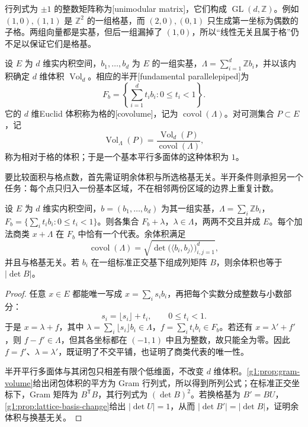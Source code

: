 行列式为 \(\pm1\) 的整数矩阵称为[unimodular matrix]，它们构成 \(\operatorname{GL}(d,\mathbb Z)\)。例如 \((1,0),(1,1)\) 是 \(\mathbb Z^2\) 的一组格基，而 \((2,0),(0,1)\) 只生成第一坐标为偶数的子格。两组向量都是实基，但后一组漏掉了 \((1,0)\)，所以“线性无关且属于格”仍不足以保证它们是格基。

\begin{definition}
	\label{g1:def:lattice-covolume}
	设 \(E\) 为 \(d\) 维实内积空间，\(b_1,\ldots,b_d\) 为 \(E\) 的一组实基，\(\Lambda=\sum_{i=1}^d\mathbb Z b_i\)，并以该内积确定 \(d\) 维体积 \(\operatorname{Vol}_d\)。相应的半开[fundamental parallelepiped]为
	\[
		F_b=\left\{\sum_{i=1}^d t_i b_i:0\le t_i<1\right\}.
	\]
	它的 \(d\) 维Euclid 体积称为格的[covolume]，记为 \(\operatorname{covol}(\Lambda)\)。对可测集合 \(P\subset E\)，记
	\[
		\operatorname{Vol}_{\Lambda}(P)
		=\frac{\operatorname{Vol}_d(P)}{\operatorname{covol}(\Lambda)},
	\]
	称为相对于格的体积；于是一个基本平行多面体的这种体积为 \(1\)。
\end{definition}

要比较面积与格点数，首先需证明余体积与所选格基无关。半开条件则承担另一个任务：每个点只归入一份基本区域，不在相邻两份区域的边界上重复计数。

\begin{proposition}
	\label{g1:prop:lattice-fundamental-domain}
	设 \(E\) 为 \(d\) 维实内积空间，\(b=(b_1,\ldots,b_d)\) 为其一组实基，\(\Lambda=\sum_i\mathbb Z b_i\)，\(F_b=\{\sum_i t_i b_i:0\le t_i<1\}\)。则各集合 \(F_b+\lambda\)，\(\lambda\in\Lambda\)，两两不交且并成 \(E\)。每个加法商类 \(x+\Lambda\) 在 \(F_b\) 中恰有一个代表。余体积满足
	\[
		\operatorname{covol}(\Lambda)
		=\sqrt{\det\bigl(\langle b_i,b_j\rangle\bigr)_{i,j=1}^d},
	\]
	并且与格基无关。若 \(b_i\) 在一组标准正交基下组成列矩阵 \(B\)，则余体积也等于 \(|\det B|\)。
\end{proposition}
\begin{proof}
	任意 \(x\in E\) 都能唯一写成 \(x=\sum_i s_i b_i\)，再把每个实数分成整数与小数部分：
	\[
		s_i=\lfloor s_i\rfloor+t_i,\qquad 0\le t_i<1.
	\]
	于是 \(x=\lambda+f\)，其中 \(\lambda=\sum_i\lfloor s_i\rfloor b_i\in\Lambda\)，\(f=\sum_i t_i b_i\in F_b\)。若还有 \(x=\lambda'+f'\)，则 \(f-f'\in\Lambda\)，但其各坐标都在 \((-1,1)\) 中且为整数，故只能全为零。因此 \(f=f'\)、\(\lambda=\lambda'\)，既证明了不交平铺，也证明了商类代表的唯一性。

	半开平行多面体与其闭包只相差有限个低维面，不改变 \(d\) 维体积。\cref{g1:prop:gram-volume}给出闭包体积的平方为 Gram 行列式，所以得到所列公式；在标准正交坐标下，Gram 矩阵为 \(B^{\mathsf T}B\)，其行列式为 \((\det B)^2\)。若换格基为 \(B'=BU\)，\cref{g1:prop:lattice-basis-change}给出 \(|\det U|=1\)，从而 \(|\det B'|=|\det B|\)，证明余体积与换基无关。
\end{proof}


